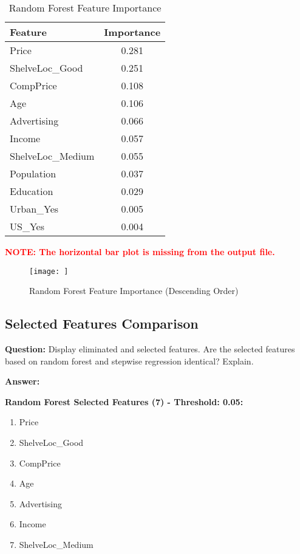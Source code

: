 \documentclass[11pt]{article}
\begin{document}
\begin{table}[H]
\centering
\caption{Random Forest Feature Importance}
\begin{tabular}{lc}
\toprule
\textbf{Feature} & \textbf{Importance} \\
\midrule
Price & 0.281 \\
ShelveLoc\_Good & 0.251 \\
CompPrice & 0.108 \\
Age & 0.106 \\
Advertising & 0.066 \\
Income & 0.057 \\
ShelveLoc\_Medium & 0.055 \\
Population & 0.037 \\
Education & 0.029 \\
Urban\_Yes & 0.005 \\
US\_Yes & 0.004 \\
\bottomrule
\end{tabular}
\end{table}

\textcolor{red}{\textbf{NOTE: The horizontal bar plot is missing from the output file.}}

\begin{figure}[H]
    \centering
    \texttt{[image: ]}
    \caption{Random Forest Feature Importance (Descending Order)}
    \label{fig:rf_importance}
\end{figure}

\subsection{Selected Features Comparison}

\textbf{Question:} Display eliminated and selected features. Are the selected features based on random forest and stepwise regression identical? Explain.

\textbf{Answer:} 

\textbf{Random Forest Selected Features (7) - Threshold: 0.05:}
\begin{enumerate}
    \item Price
    \item ShelveLoc\_Good
    \item CompPrice
    \item Age
    \item Advertising
    \item Income
    \item ShelveLoc\_Medium
\end{enumerate}
\end{document}
